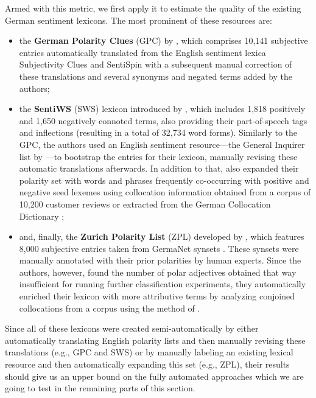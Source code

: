 Armed with this metric, we first apply it to estimate the quality of
the existing German sentiment lexicons.  The most prominent of these
resources are:
\begin{itemize}
\item the \textbf{German Polarity Clues} (GPC) by
  \citet{Waltinger:10}, which comprises 10,141 subjective entries
  automatically translated from the English sentiment lexica
  Subjectivity Clues \cite{Wilson:05} and SentiSpin \cite{Takamura:05}
  with a subsequent manual correction of these translations and
  several synonyms and negated terms added by the authors;

\item the \textbf{SentiWS} (SWS) lexicon introduced by
  \citet{Remus:10}, which includes 1,818 positively and 1,650
  negatively connoted terms, also providing their part-of-speech tags
  and inflections (resulting in a total of 32,734 word forms).
  Similarly to the GPC, the authors used an English sentiment
  resource---the General Inquirer list by \citet{Stone:66}---to
  bootstrap the entries for their lexicon, manually revising these
  automatic translations afterwards.  In addition to that,
  \citet{Remus:10} also expanded their polarity set with words and
  phrases frequently co-occurring with positive and negative seed
  lexemes using collocation information obtained from a corpus of
  10,200 customer reviews or extracted from the German Collocation
  Dictionary \cite{Quasthoff:10};

\item and, finally, the \textbf{Zurich Polarity List} (ZPL) developed
  by \citet{Clematide:10}, which features 8,000 subjective entries
  taken from GermaNet synsets \cite{Hamp:97}.  These synsets were
  manually annotated with their prior polarities by human experts.
  Since the authors, however, found the number of polar adjectives
  obtained that way insufficient for running further classification
  experiments, they automatically enriched their lexicon with more
  attributive terms by analyzing conjoined collocations from a corpus
  using the method of \citet{Hatzivassi:97}.
\end{itemize}
Since all of these lexicons were created semi-automatically by either
automatically translating English polarity lists and then manually
revising these translations (e.g., GPC and SWS) or by manually
labeling an existing lexical resource and then automatically expanding
this set (e.g., ZPL), their results should give us an upper bound on
the fully automated approaches which we are going to test in the
remaining parts of this section.

